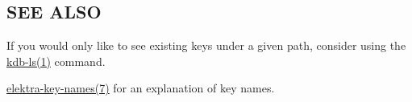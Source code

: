 \subsection*{S\+EE A\+L\+SO}


\begin{DoxyItemize}
\item If you would only like to see existing keys under a given path, consider using the \hyperlink{md_doc_help_kdb-ls_doc_help_kdb-ls_md}{kdb-\/ls(1)} command.
\item \hyperlink{md_doc_help_elektra-key-names_doc_help_elektra-key-names_md}{elektra-\/key-\/names(7)} for an explanation of key names. 
\end{DoxyItemize}